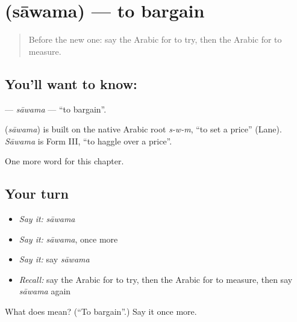 \section[\texorpdfstring{\ar{ساوم} (sāwama)}{ساوم (sāwama)}]{ (sāwama) — to bargain}

\label{lesson:AR-C193-sawama}



\begin{quote}
Before the new one: say the Arabic for to try, then the Arabic for to measure.
\end{quote}

\subsection*{You'll want to know: }
\textbf{} — \emph{sāwama} — \textquotedblleft{}to bargain\textquotedblright{}.

\begin{cousinweb}
\textbf{} (\emph{sāwama}) is built on the native Arabic root \emph{s-w-m}, \textquotedblleft{}to set a price\textquotedblright{} (Lane). \emph{Sāwama} is Form III, \textquotedblleft{}to haggle over a price\textquotedblright{}.
\end{cousinweb}

\begin{grammarlens}[title={What you've built}]
One more word for this chapter.
\end{grammarlens}

\subsection*{Your turn}
\begin{itemize}
\raggedright
  \item \emph{Say it:} \emph{sāwama}
  \item \emph{Say it:} \emph{sāwama}, once more
  \item \emph{Say it:} say \emph{sāwama}
  \item \emph{Recall:} say the Arabic for to try, then the Arabic for to measure, then say \emph{sāwama} again
\end{itemize}

\begin{tcolorbox}[breakable,colback=teal!4,colframe=teal!35!black,title={Before you move on}]
What does  mean? (\textquotedblleft{}To bargain\textquotedblright{}.) Say it once more.
\end{tcolorbox}
